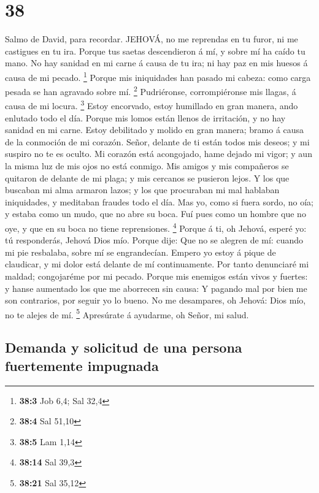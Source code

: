 \hypertarget{section-37}{%
\section{38}\label{section-37}}

 Salmo de David, para recordar. JEHOVÁ, no me reprendas en
tu furor, ni me castigues en tu ira.  Porque tus saetas
descendieron á mí, y sobre mí ha caído tu mano.  No hay
sanidad en mi carne á causa de tu ira; ni hay paz en mis huesos á causa
de mi pecado. \footnote{\textbf{38:3} Job 6,4; Sal 32,4} 
Porque mis iniquidades han pasado mi cabeza: como carga pesada se han
agravado sobre mí. \footnote{\textbf{38:4} Sal 51,10} 
Pudriéronse, corrompiéronse mis llagas, á causa de mi locura.
\footnote{\textbf{38:5} Lam 1,14}  Estoy encorvado, estoy
humillado en gran manera, ando enlutado todo el día.  Porque
mis lomos están llenos de irritación, y no hay sanidad en mi carne.
 Estoy debilitado y molido en gran manera; bramo á causa de
la conmoción de mi corazón.  Señor, delante de ti están
todos mis deseos; y mi suspiro no te es oculto.  Mi corazón
está acongojado, hame dejado mi vigor; y aun la misma luz de mis ojos no
está conmigo.  Mis amigos y mis compañeros se quitaron de
delante de mi plaga; y mis cercanos se pusieron lejos.  Y
los que buscaban mi alma armaron lazos; y los que procuraban mi mal
hablaban iniquidades, y meditaban fraudes todo el día.  Mas
yo, como si fuera sordo, no oía; y estaba como un mudo, que no abre su
boca.  Fuí pues como un hombre que no oye, y que en su boca
no tiene reprensiones. \footnote{\textbf{38:14} Sal 39,3} 
Porque á ti, oh Jehová, esperé yo: tú responderás, Jehová Dios mío.
 Porque dije: Que no se alegren de mí: cuando mi pie
resbalaba, sobre mí se engrandecían.  Empero yo estoy á
pique de claudicar, y mi dolor está delante de mí continuamente.
 Por tanto denunciaré mi maldad; congojaréme por mi pecado.
 Porque mis enemigos están vivos y fuertes: y hanse
aumentado los que me aborrecen sin causa:  Y pagando mal
por bien me son contrarios, por seguir yo lo bueno.  No me
desampares, oh Jehová: Dios mío, no te alejes de mí. \footnote{\textbf{38:21}
  Sal 35,12}  Apresúrate á ayudarme, oh Señor, mi salud.

\hypertarget{demanda-y-solicitud-de-una-persona-fuertemente-impugnada}{%
\subsection{Demanda y solicitud de una persona fuertemente
impugnada}\label{demanda-y-solicitud-de-una-persona-fuertemente-impugnada}}

